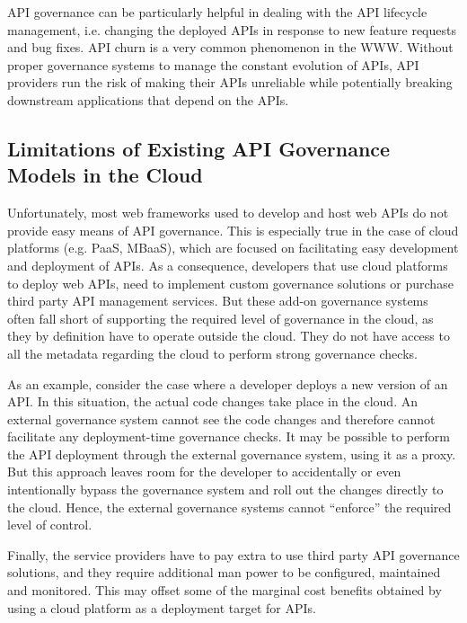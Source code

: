 API governance can be particularly helpful in dealing with the API lifecycle management, i.e. changing the deployed APIs in response to new
feature requests and bug fixes. API churn is a very common phenomenon in the WWW. Without
proper governance systems to manage the constant evolution of APIs, API providers run the risk of making their APIs unreliable
while potentially breaking downstream applications that depend on the APIs.

\subsection{Limitations of Existing API Governance Models in the Cloud}
Unfortunately, most web frameworks used to develop and host web APIs do not provide easy means of API governance. This is
especially true in the case of cloud platforms (e.g. PaaS, MBaaS), which are focused on facilitating easy development
and deployment of APIs. As a consequence, developers that use cloud platforms to deploy web APIs, 
need to implement custom governance solutions or purchase third party API management services. But 
these add-on governance
systems often fall short of supporting the required level of governance in the cloud, as they by definition have to operate outside the
cloud. They do not have access to all the metadata regarding the cloud to perform strong governance checks. 

As an example, consider the case where a developer deploys a new version of an API. In this
situation, the actual code changes take place in the cloud. An 
external governance system cannot see the code changes and therefore cannot facilitate any deployment-time governance checks.
It may be possible to perform the API deployment through the external governance system, using it
as a proxy. But this approach leaves room for the developer to accidentally
or even intentionally bypass the governance system and roll out the changes directly to the cloud. Hence, the external governance systems
cannot ``enforce'' the required level of control.

Finally, the service providers have to pay extra to use third party API governance solutions, and they require
additional man power to be configured, maintained and monitored. This may offset some of the marginal cost benefits obtained
by using a cloud platform as a deployment target for APIs.